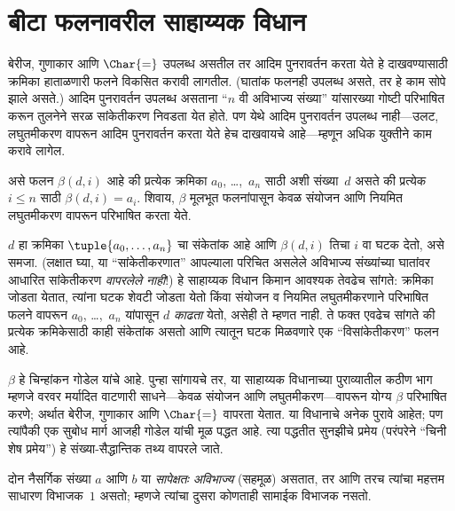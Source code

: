 










\section{बीटा फलनावरील साहाय्यक विधान}\label{inc:req:bet:sec}


बेरीज, गुणाकार आणि $\Char{=}$ उपलब्ध असतील तर आदिम पुनरावर्तन
करता येते हे दाखवण्यासाठी क्रमिका हाताळणारी फलने विकसित करावी लागतील.
(घातांक फलनही उपलब्ध असते, तर हे काम सोपे झाले असते.) आदिम
पुनरावर्तन उपलब्ध असताना ``$n$ वी अविभाज्य संख्या'' यांसारख्या
गोष्टी परिभाषित करून तुलनेने सरळ सांकेतीकरण निवडता येत होते.
पण येथे आदिम पुनरावर्तन उपलब्ध नाही---उलट, लघुतमीकरण वापरून
आदिम पुनरावर्तन करता येते हेच दाखवायचे आहे---म्हणून अधिक
युक्तीने काम करावे लागेल.

\begin{lem}
\label{inc:req:bet:lem:beta}
असे फलन $\beta(d,i)$ आहे की प्रत्येक क्रमिका $a_0$,
\dots,~$a_n$ साठी अशी संख्या~$d$ असते की प्रत्येक $i \le n$
साठी $\beta(d,i) = a_i$. शिवाय, $\beta$ मूलभूत फलनांपासून
केवळ संयोजन आणि नियमित लघुतमीकरण वापरून परिभाषित करता येते.
\end{lem}

$d$ हा क्रमिका $\tuple{a_0, \dots, a_n}$ चा संकेतांक आहे
आणि $\beta(d,i)$ तिचा $i$ वा घटक देतो, असे समजा.
(लक्षात घ्या, या ``सांकेतीकरणात'' आपल्याला परिचित असलेले
अविभाज्य संख्यांच्या घातांवर आधारित सांकेतीकरण \emph{वापरलेले नाही}!)
हे साहाय्यक विधान किमान आवश्यक तेवढेच सांगते: क्रमिका जोडता
येतात, त्यांना घटक शेवटी जोडता येतो किंवा संयोजन व नियमित
लघुतमीकरणाने परिभाषित फलने वापरून $a_0$, \dots,~$a_n$
यांपासून $d$ \emph{काढता} येतो, असेही ते म्हणत नाही. ते फक्त
एवढेच सांगते की प्रत्येक क्रमिकेसाठी काही संकेतांक असतो आणि
त्यातून घटक मिळवणारे एक ``विसांकेतीकरण'' फलन आहे.

$\beta$ हे चिन्हांकन गोडेल यांचे आहे. पुन्हा सांगायचे तर,
या साहाय्यक विधानाच्या पुराव्यातील कठीण भाग म्हणजे वरवर
मर्यादित वाटणारी साधने---केवळ संयोजन आणि लघुतमीकरण---वापरून
योग्य $\beta$ परिभाषित करणे; अर्थात बेरीज, गुणाकार आणि
$\Char{=}$ वापरता येतात. या विधानाचे अनेक पुरावे आहेत; पण
त्यांपैकी एक सुबोध मार्ग आजही गोडेल यांची मूळ पद्धत आहे.
त्या पद्धतीत सुनझीचे प्रमेय (परंपरेने ``चिनी शेष प्रमेय'')
हे संख्या-सैद्धान्तिक तथ्य वापरले जाते.

\begin{defn}
दोन नैसर्गिक संख्या $a$ आणि $b$ या \emph{सापेक्षतः अविभाज्य}
(सहमूळ) असतात, तर आणि तरच त्यांचा महत्तम साधारण
विभाजक~$1$ असतो; म्हणजे त्यांचा दुसरा कोणताही सामाईक विभाजक नसतो.
\end{defn}

